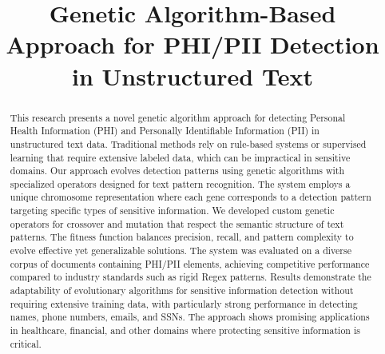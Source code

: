 \documentclass[conference]{IEEEtran}
\begin{document}
\title{Genetic Algorithm-Based Approach for PHI/PII Detection in Unstructured Text\\
}

\author{
\and
{}
\and
{}
}

\maketitle

\begin{abstract}
This research presents a novel genetic algorithm approach for detecting Personal Health Information (PHI) and Personally Identifiable Information (PII) in unstructured text data. Traditional methods rely on rule-based systems or supervised learning that require extensive labeled data, which can be impractical in sensitive domains. Our approach evolves detection patterns using genetic algorithms with specialized operators designed for text pattern recognition. The system employs a unique chromosome representation where each gene corresponds to a detection pattern targeting specific types of sensitive information. We developed custom genetic operators for crossover and mutation that respect the semantic structure of text patterns. The fitness function balances precision, recall, and pattern complexity to evolve effective yet generalizable solutions. The system was evaluated on a diverse corpus of documents containing PHI/PII elements, achieving competitive performance compared to industry standards such as rigid Regex patterns. Results demonstrate the adaptability of evolutionary algorithms for sensitive information detection without requiring extensive training data, with particularly strong performance in detecting names, phone numbers, emails, and SSNs. The approach shows promising applications in healthcare, financial, and other domains where protecting sensitive information is critical.
\end{abstract}
\end{document}
